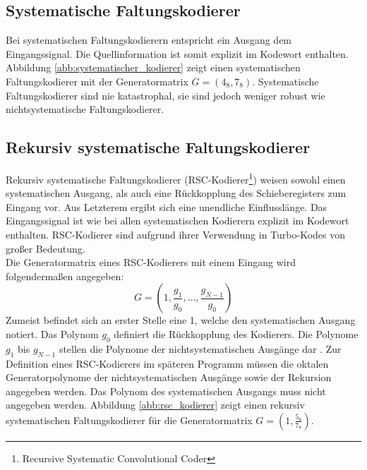 \subsection{Systematische Faltungskodierer}
\label{kapitel:grundlagen_systematische_kodierer}
Bei systematischen Faltungskodierern entspricht ein Ausgang dem Eingangssignal. Die Quellinformation ist somit explizit im Kodewort enthalten. Abbildung \ref{abb:systematischer_kodierer} zeigt einen systematischen Faltungskodierer mit der Generatormatrix $G=\left( 4_{8},7_{8}\right)$. Systematische Faltungskodierer sind nie katastrophal, sie sind jedoch weniger robust wie nichtsystematische Faltungskodierer. \cite[S. 217]{schonfeld2012informations}

\subsection{Rekursiv systematische Faltungskodierer}
\label{kapitel:grundlagen_rsc}
Rekursiv systematische Faltungskodierer (RSC-Kodierer\footnote{Recursive Systematic Convolutional Coder}) weisen sowohl einen systematischen Ausgang, als auch eine Rückkopplung des Schieberegisters zum Eingang vor. Aus Letzterem ergibt sich eine unendliche Einflusslänge. Das Eingangssignal ist wie bei allen systematischen Kodierern explizit im Kodewort enthalten. RSC-Kodierer sind aufgrund ihrer Verwendung in Turbo-Kodes von großer Bedeutung.
\\
Die Generatormatrix eines RSC-Kodierers mit einem Eingang wird folgendermaßen angegeben:
\begin{equation}
G=\left( 1, \frac{g_{1}}{g_{0}},\dots , \frac{g_{N-1}}{g_{0}} \right)
\end{equation}
Zumeist befindet sich an erster Stelle eine 1, welche den systematischen Ausgang notiert. Das Polynom $g_{0}$ definiert die Rückkopplung des Kodierers. Die Polynome $g_{1}$ bis $g_{N-1}$ stellen die Polynome der nichtsystematischen Ausgänge dar \cite{morelos2006art}. Zur Definition eines RSC-Kodierers im späteren Programm müssen die oktalen Generatorpolynome der nichtsystematischen Ausgänge sowie der Rekursion angegeben werden. Das Polynom des systematischen Ausgangs muss nicht angegeben werden. Abbildung \ref{abb:rsc_kodierer} zeigt einen rekursiv systematischen Faltungskodierer für die Generatormatrix $G=\left( 1,\frac{5_{8}}{7_{8}}\right)$.

